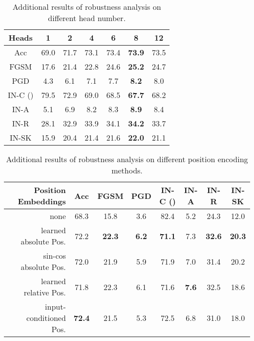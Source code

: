 \documentclass[10pt,twocolumn,letterpaper]{article}
\begin{document}
\begin{table}[h]
\footnotesize
    \centering

\begin{tabular}{c|c|c|c|c|c|c}
	\toprule
	Heads & 1 & 2 & 4 & 6 & 8 & 12  \\
	\midrule
	Acc & 69.0 & 71.7 & 73.1 & 73.4 & \textbf{73.9} & 73.5 \\
	FGSM & 17.6 & 21.4 & 22.8 & 24.6 & \textbf{25.2} & 24.7 \\ 
	PGD & 4.3 & 6.1 & 7.1 & 7.7 & \textbf{8.2} & 8.0 \\ 
	IN-C () & 79.5 & 72.9 & 69.0 & 68.5 & \textbf{67.7} & 68.2 \\ 
	IN-A & 5.1 & 6.9 & 8.2 & 8.3 & \textbf{8.9} & 8.4 \\ 
	IN-R & 28.1 & 32.9 & 33.9 & 34.1 & \textbf{34.2} & 33.7 \\ 
	IN-SK & 15.9 & 20.4 & 21.4 & 21.6 & \textbf{22.0} & 21.1 \\ 
	
	\bottomrule
\end{tabular}
\vspace{2mm}
    \caption{Additional results of robustness analysis on different head number.}
    \label{tab:appendix_head}
\end{table}

\begin{table*}[h]
\footnotesize
    \centering
\begin{tabular}{lr|c|c|c|c|c|c|c}
\toprule
&Position Embeddings & Acc & FGSM & PGD & IN-C () & IN-A & IN-R & IN-SK  \\
\midrule
&none   & 68.3 & 15.8 &3.6 & 82.4 & 5.2 &24.3 & 12.0\\ 
&learned absolute Pos. & 72.2 & \textbf{22.3} & \textbf{6.2} & \textbf{71.1} & 7.3 & \textbf{32.6} & \textbf{20.3}  \\
&sin-cos absolute Pos. & 72.0 & 21.9 & 5.9 & 71.9 & 7.0 & 31.4 & 20.2  \\ 
&learned relative Pos.\cite{shaw2018self}  & 71.8 & 22.3 & 6.1 &71.6 &\textbf{7.6} & 32.5 & 18.6 \\
&input-conditioned Pos.\cite{chu2021we} & \textbf{72.4} & 21.5 & 5.3 & 72.5 & 6.8 & 31.0 & 18.0 \\
\bottomrule
\end{tabular}
\vspace{2mm}
    \caption{Additional results of robustness analysis on different position encoding methods.}
    \label{tab:appendix_posemb}
\end{table*}
\end{document}
